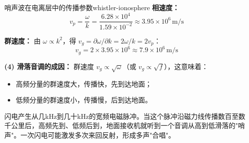 \begin{example}{哨声波在电离层中的传播参数}{whistler-ionosphere}
\textbf{相速度：}
\[
v_p = \frac{\omega}{k} = \frac{6.28\times 10^4}{1.59\times 10^{-2}} \approx 3.95\times 10^6\,\mathrm{m/s}
\]

\textbf{群速度：} 由 $\omega \propto k^2$，得 $v_g = \partial\omega/\partial k = 2\omega/k = 2v_p$：
\[
v_g = 2\times 3.95\times 10^6 \approx 7.9\times 10^6\,\mathrm{m/s}
\]

\textbf{(4) 滑落音调的成因：}
群速度 $v_g \propto \sqrt{\omega}$（或 $v_g \propto \sqrt{f}$），这意味着：
\begin{itemize}[leftmargin=*,itemsep=0pt]
\item 高频分量的群速度大，传播快，先到达地面；
\item 低频分量的群速度小，传播慢，后到达地面。
\end{itemize}
闪电产生从几kHz到几十kHz的宽频电磁脉冲。当这个脉冲沿磁力线传播数百至数千公里后，高频先到、低频后到，地面接收机就听到一个音调从高到低滑落的"哨声"。一次闪电可能激发多次来回反射，形成多声"合唱"。
\end{example}

